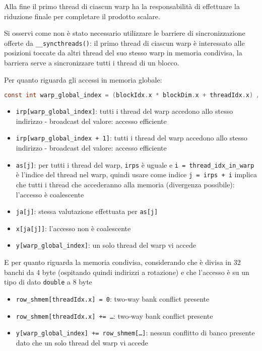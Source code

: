 \documentclass[a4paper,9pt]{extarticle}
\begin{document}
Alla fine il primo thread di ciascun warp ha la responsabilità di effettuare la riduzione finale per completare il 
prodotto scalare.

Si osservi come non è stato necessario utilizzare le barriere di sincronizzazione offerte da \texttt{\_\_syncthreads()}:
il primo thread di ciascun warp è interessato alle posizioni toccate da altri thread del suo stesso warp
in memoria condivisa, la barriera serve a sincronizzare tutti i thread di un blocco.

Per quanto riguarda gli accessi in memoria globale:

\begin{lstlisting}[language=C]
const int warp_global_index = (blockIdx.x * blockDim.x + threadIdx.x) / warpSize;
\end{lstlisting}

\begin{itemize}
	\item \texttt{irp[warp\_global\_index]}: tutti i thread del warp accedono allo stesso indirizzo - broadcast del valore: accesso efficiente
	\item \texttt{irp[warp\_global\_index + 1]}: tutti i thread del warp accedono allo stesso indirizzo - broadcast del valore: accesso efficiente
	\item \texttt{as[j]}: per tutti i thread del warp, \texttt{irps} è uguale e \texttt{i = thread\_idx\_in\_warp} è l'indice del thread nel
	warp, quindi usare come indice \texttt{j = irps + i} implica che tutti i thread che accederanno alla memoria (divergenza possibile): l'accesso è coalescente
	\item \texttt{ja[j]}: stessa valutazione effettuata per \texttt{as[j]}
	\item \texttt{x[ja[j]]}: l'accesso non è coalescente
	\item \texttt{y[warp\_global\_index]}: un solo thread del warp vi accede
\end{itemize}

E per quanto riguarda la memoria condivisa, considerando che è divisa in 32 banchi da 4 byte (ospitando quindi indirizzi
a rotazione) e che l'accesso è su un tipo di dato \texttt{double} a 8 byte

\begin{itemize}
	\item \texttt{row\_shmem[threadIdx.x] = 0}: two-way bank conflict presente
	\item \texttt{row\_shmem[threadIdx.x] += \dots}: two-way bank conflict presente
	\item \texttt{y[warp\_global\_index] += row\_shmem[\dots]}: nessun conflitto di banco presente dato che un
	solo thread del warp vi accede
\end{itemize}
\end{document}
